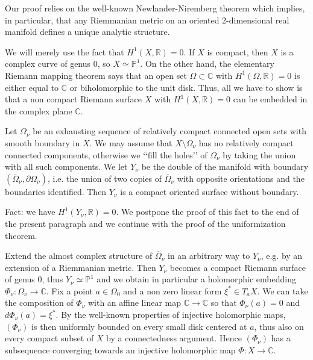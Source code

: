 \documentclass[12pt]{article}
\begin{document}
Our proof relies on the well-known Newlander-Niremberg theorem which implies, in particular, that any Riemmanian metric on an oriented $2$-dimensional real manifold defines a unique analytic structure.

We will merely use the fact that $H^1(X,\mathbb R)=0$. If $X$ is compact, then $X$ is a complex curve of genus $0$, so $X\simeq\mathbb P^1$. On the other hand, the elementary Riemann mapping theorem says that an open set $\Omega\subset\mathbb C$ with $H^1(\Omega,\mathbb R)=0$ is either equal to $\mathbb C$ or biholomorphic to the unit disk. Thus, all we have to show is that a non compact Riemann surface $X$ with $H^1(X,\mathbb R)=0$ can be embedded in the complex plane $\mathbb C$.

Let $\Omega_\nu$ be an exhausting sequence of relatively compact connected open sets with smooth boundary in $X$. We may assume that $X\setminus\Omega_\nu$ has no relatively compact connected components, otherwise we \lq\lq fill the holes\rq\rq{} of $\Omega_\nu$ by taking the union with all such components. We let $Y_\nu$ be the double of the manifold with boundary $(\overline\Omega_\nu,\partial\Omega_\nu)$, i.e. the union of two copies of $\overline\Omega_\nu$ with opposite orientations and the boundaries identified. Then $Y_\nu$ is a compact oriented surface without boundary.

Fact: we have $H^1(Y_\nu,\mathbb R)=0$. We postpone the proof of this fact to the end of the present paragraph and we continue with the proof of the uniformization theorem.

Extend the almost complex structure of $\overline\Omega_\nu$ in an arbitrary way to $Y_\nu$, e.g. by an extension of a Riemmanian metric. Then $Y_\nu$ becomes a compact Riemann surface of genus $0$, thus $Y_\nu\simeq\mathbb P^1$ and we obtain in particular a holomorphic embedding $\Phi_\nu\colon\Omega_\nu\to\mathbb C$. Fix a point $a\in\Omega_0$ and a non zero linear form $\xi^*\in T_aX$. We can take the composition of $\Phi_\nu$ with an affine linear map $\mathbb C\to\mathbb C$ so that $\Phi_\nu(a)=0$ and $d\Phi_\nu(a)=\xi^*$. By the well-known properties of injective holomorphic maps, $(\Phi_\nu)$ is then uniformly bounded on every small disk centered at $a$, thus also on every compact subset of $X$ by a connectedness argument. Hence $(\Phi_\nu)$ has a subsequence converging towards an injective holomorphic map $\Phi\colon X\to\mathbb C$.
\end{document}
